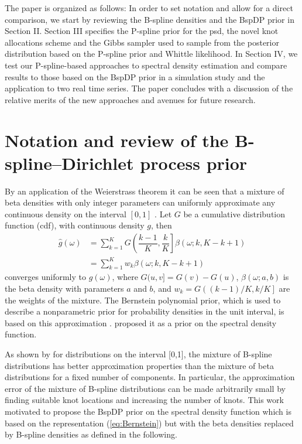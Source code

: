 \documentclass[twocolumn,final]{svjour3}
\begin{document}
The paper is organized as follows: In order to set notation and allow for a direct comparison, we start by
reviewing the B-spline densities and the BspDP prior in Section II. Section III specifies the P-spline prior for the psd, the novel knot allocations scheme and the Gibbs sampler used to sample from the posterior distribution based on the P-spline prior and Whittle likelihood.  In Section IV, we test our P-spline-based approaches to spectral density estimation and compare results to those based on the BspDP prior in a simulation study and the application to two real time series. The paper concludes with a discussion of the relative merits of the new approaches and avenues for future research.

\section{Notation and review of the B-spline--Dirichlet process prior}

By an application of the Weierstrass theorem it can be seen that a mixture of beta densities with only integer parameters can uniformly approximate any continuous density  on the interval $[0,1]$ \citep{Choudhuri:2004}.  Let $G$ be a cumulative distribution function (cdf), with continuous density $g$, then 
\begin{align}
\label{eq:Bernstein}
\widehat{g}(\omega) &= \sum_{k=1}^{K} G \left( \dfrac{k-1}{K} , \dfrac{k}{K} \right] \beta(\omega; k, K-k+1)\\
&= \sum_{k=1}^{K} w_k \beta(\omega; k, K-k+1) \nonumber
\end{align}	  
converges uniformly to $g(\omega)$, where $G(u,v] = G(v) - G(u)$, $\beta(\omega; a,b)$ is the beta density with parameters $a$ and $b$, and $w_k=G\left((k-1)/K, k/K \right]$ are the weights of the mixture.
The Bernstein polynomial prior, which is used to describe a nonparametric prior for probability densities in the unit interval, is based on this approximation \citep{Petrone:1999a,Petrone:199b}.  \cite{Choudhuri:2004} proposed it as a prior on the spectral density function.

As shown by \cite{Perron:2001} for distributions on the interval [0,1], the mixture of B-spline distributions has better approximation properties than the mixture of beta distributions for a fixed number of components. In particular, the approximation error of the mixture of B-spline distributions 
can be made arbitrarily small by finding  suitable knot locations and increasing the number of knots.
This work motivated \cite{Edwards2019} to propose the BspDP prior on the spectral density function which is based on the representation (\ref{eq:Bernstein}) but with
the beta densities replaced by B-spline densities as defined in the following.
\end{document}
